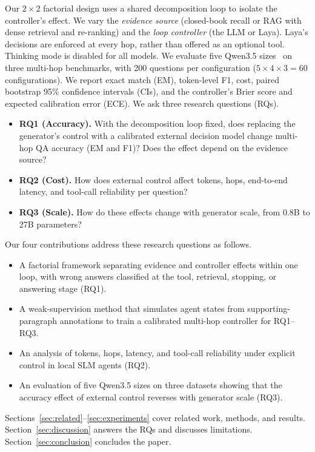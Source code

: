 Our $2\times2$ factorial design uses a shared decomposition loop to isolate the
controller's effect. We vary the \emph{evidence source}
(closed-book recall or RAG with dense retrieval and re-ranking) and the \emph{loop
controller} (the LLM or Laya). Laya's decisions are enforced at every hop, rather than
offered as an optional tool. Thinking mode is disabled for all models. We evaluate five
Qwen3.5 sizes~\cite{qwen35} on three multi-hop benchmarks, with 200 questions per
configuration ($5\times4\times3=60$ configurations). We report exact match (EM),
token-level F1, cost, paired bootstrap 95\% confidence intervals (CIs), and the
controller's Brier score and expected calibration error (ECE). We ask
three research questions (RQs).
\begin{itemize}
  \item \textbf{RQ1 (Accuracy).} With the decomposition loop fixed, does replacing the
        generator's control with a calibrated external decision model change multi-hop QA
        accuracy (EM and F1)? Does the effect depend on the evidence source?
  \item \textbf{RQ2 (Cost).} How does external control affect tokens, hops, end-to-end
        latency, and tool-call reliability per question?
  \item \textbf{RQ3 (Scale).} How do these effects change with generator scale, from
        0.8B to 27B parameters?
\end{itemize}

Our four contributions address these research questions as follows.
\begin{itemize}
  \item A factorial framework separating evidence and controller effects within one loop,
        with wrong answers classified at the tool, retrieval, stopping, or answering
        stage (RQ1).
  \item A weak-supervision method that simulates agent states from supporting-paragraph
        annotations to train a calibrated multi-hop controller for RQ1--RQ3.
  \item An analysis of tokens, hops, latency, and tool-call reliability under explicit
        control in local SLM agents (RQ2).
  \item An evaluation of five Qwen3.5 sizes on three datasets showing that the accuracy
        effect of external control reverses with generator scale (RQ3).
\end{itemize}

Sections~\ref{sec:related}--\ref{sec:experiments} cover related work, methods, and results.
Section~\ref{sec:discussion} answers the RQs and discusses limitations.
Section~\ref{sec:conclusion} concludes the paper.
